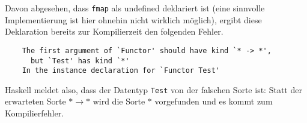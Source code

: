 Davon abgesehen, dass \texttt{fmap} als undefined deklariert ist (eine sinnvolle Implementierung ist hier ohnehin nicht wirklich
möglich), ergibt diese Deklaration bereits zur Kompilierzeit den folgenden Fehler.

\begin{verbatim}
    The first argument of `Functor' should have kind `* -> *',
      but `Test' has kind `*'
    In the instance declaration for `Functor Test'
\end{verbatim}

Haskell meldet also, dass der Datentyp \texttt{Test} von der falschen Sorte ist: Statt der erwarteten Sorte $* \rightarrow *$
wird die Sorte $*$ vorgefunden und es kommt zum Kompilierfehler.


